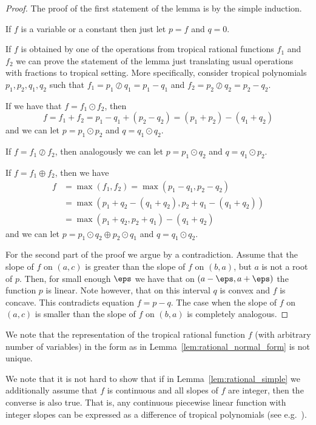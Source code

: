 \documentclass[11pt]{article}
\newcommand{\ta}{\oplus}
\newcommand{\tp}{\odot}
\newcommand{\td}{\oslash}
\begin{document}
\begin{proof}
The proof of the first statement of the lemma is by the simple induction.

If $f$ is a variable or a constant then just let $p=f$ and $q=0$.

If $f$ is obtained by one of the operations from tropical rational functions $f_1$ and $f_2$ we can prove the statement of the lemma just translating usual operations with fractions to tropical setting. More specifically, consider tropical polynomials $p_1, p_2, q_1, q_2$ such that $f_1 = p_1 \td q_1 = p_1 - q_1$ and $f_2 = p_2 \td q_2 = p_2 - q_2$.

If we have that $f = f_1 \tp f_2$, then
$$
f = f_1 + f_2 = p_1 - q_1 + (p_2 - q_2) = (p_1 + p_2) - (q_1 + q_2)
$$
and we can let $p = p_1 \tp p_2$ and $q = q_1 \tp q_2$.

If $f = f_1\td f_2$, then analogously we can let $p = p_1 \tp q_2$ and $q = q_1 \tp p_2$.

If $f = f_1 \ta f_2$, then we have
\begin{align*}
f &= \max{(f_1, f_2)} = \max{(p_1 - q_1, p_2 - q_2)} \\
&= \max{\left(p_1 + q_2 - (q_1 + q_2), p_2 + q_1 - (q_1 + q_2)\right)}\\
& = \max{(p_1 + q_2, p_2 + q_1)} - (q_1 + q_2)
\end{align*}
and we can let $p = p_1 \tp q_2 \ta p_2 \tp q_1$ and $q = q_1 \tp q_2$.

For the second part of the proof we argue by a contradiction. Assume that the slope of $f$ on $(a,c)$ is greater than the slope of $f$ on $(b,a)$, but $a$ is not a root of $p$. Then, for small enough $\eps$ we have that on $(a -\eps, a+\eps)$ the function $p$ is linear. Note however, that on this interval $q$ is convex and $f$ is concave. This contradicts equation $f = p - q$. The case when the slope of $f$ on $(a,c)$ is smaller than the slope of $f$ on $(b,a)$ is completely analogous.
\end{proof}

\begin{remark}
We note that the representation of the tropical rational function $f$ (with arbitrary number of variables) in the form as in Lemma~\ref{lem:rational_normal_form} is not unique.
\end{remark}

\begin{remark}
We note that it is not hard to show that if in Lemma~\ref{lem:rational_simple} we additionally assume that $f$ is continuous and all slopes of $f$ are integer, then the converse is also true. That is, any continuous piecewise linear function with integer slopes can be expressed as a difference of tropical polynomials (see e.g.~\cite{CuninghameG80,Ovchinnikov02}).
\end{remark}
\end{document}
